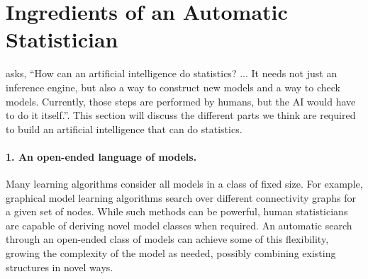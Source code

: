 

\section{Ingredients of an Automatic Statistician}
\label{sec:ingredients}
\citet{gelman2013philblogpost} asks, ``How can an artificial intelligence do statistics? ... It needs not just an inference engine, but also a way to construct new models and a way to check models. Currently, those steps are performed by humans, but the AI would have to do it itself.''.
%
This section will discuss the different parts we think are required to build an artificial intelligence that can do statistics.

\paragraph{1. An open-ended language of models.}
Many learning algorithms consider all models in a class of fixed size.
For example, graphical model learning algorithms \citep{Friedman03,Eaton07_uai} search over different connectivity graphs for a given set of nodes.
While such methods can be powerful, human statisticians are capable of deriving novel model classes when required.
An automatic search through an open-ended class of models can achieve some of this flexibility, growing the complexity of the model as needed, possibly combining existing structures in novel ways.

